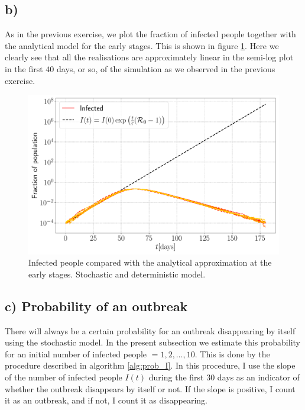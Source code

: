 \subsection{b)}

As in the previous exercise, we plot the fraction of infected people together with the analytical model for the early stages. This is shown in figure \ref{fig:Infected_stoch}. Here we clearly see that all the realisations are approximately linear in the semi-log plot in the first $40$ days, or so, of the simulation as we observed in the previous exercise. 

\begin{figure}[htb]
	\centering
	\includegraphics[width=0.8\columnwidth]{../fig/2Bb_I.pdf}
	\caption{Infected people compared with the analytical approximation at the early stages. Stochastic and deterministic model.}
	\label{fig:Infected_stoch}
\end{figure}

\subsection{c) Probability of an outbreak}

There will always be a certain probability for an outbreak disappearing by itself using the stochastic model. In the present subsection we estimate this probability for an initial number of infected people $=1,2,\dots,10$. This is done by the procedure described in algorithm \ref{alg:prob_I}. In this procedure, I use the slope of the number of infected people $I(t)$ during the first $30$ days as an indicator of whether the outbreak disappears by itself or not. If the slope is positive, I count it as an outbreak, and if not, I count it as disappearing.

